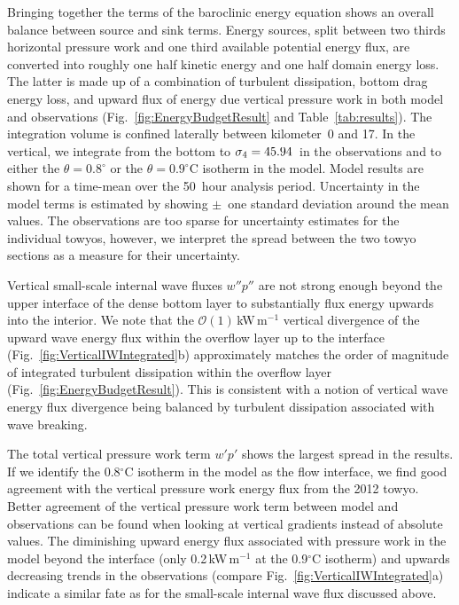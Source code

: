 \documentclass{ametsocV6.1}
\begin{document}
Bringing together the terms of the baroclinic energy equation shows an overall balance between source and sink terms.
Energy sources, split between two thirds horizontal pressure work and one third available potential energy flux, are converted into roughly one half kinetic energy and one half domain energy loss.
The latter is made up of a combination of turbulent dissipation, bottom drag energy loss, and upward flux of energy due vertical pressure work in both model and observations (Fig.~\ref{fig:EnergyBudgetResult} and Table~\ref{tab:results}).
The integration volume is confined laterally between kilometer~0 and 17.
In the vertical, we integrate from the bottom to $\sigma_4=45.94$\,\TyUpperIntLimitUnit{} in the observations and to either the $\theta=0.8^{\circ}$ or the $\theta=0.9^{\circ}$C isotherm in the model.
Model results are shown for a time-mean over the 50~hour analysis period.
Uncertainty in the model terms is estimated by showing $\pm$~one standard deviation around the mean values.
The observations are too sparse for uncertainty estimates for the individual towyos, however, we interpret the spread between the two towyo sections as a measure for their uncertainty.

Vertical small-scale internal wave fluxes $w''p''$ are not strong enough beyond the upper interface of the dense bottom layer to substantially flux energy upwards into the interior.
We note that the $\mathcal{O}(1)$\,kW\,m$^{-1}$ vertical divergence of the upward wave energy flux within the overflow layer up to the interface (Fig.~\ref{fig:VerticalIWIntegrated}b) approximately matches the order of magnitude of integrated turbulent dissipation within the overflow layer (Fig.~\ref{fig:EnergyBudgetResult}).
This is consistent with a notion of vertical wave energy flux divergence being balanced by turbulent dissipation associated with wave breaking.

The total vertical pressure work term $w'p'$ shows the largest spread in the results.
If we identify the 0.8$^{\circ}$C isotherm in the model as the flow interface, we find good agreement with the vertical pressure work energy flux from the 2012 towyo. 
Better agreement of the vertical pressure work term between model and observations can be found when looking at vertical gradients instead of absolute values.
The diminishing upward energy flux associated with pressure work in the model beyond the interface (only 0.2\,kW\,m$^{-1}$ at the 0.9$^{\circ}$C isotherm) and upwards decreasing trends in the observations (compare Fig.~\ref{fig:VerticalIWIntegrated}a) indicate a similar fate as for the small-scale internal wave flux discussed above.
\end{document}
